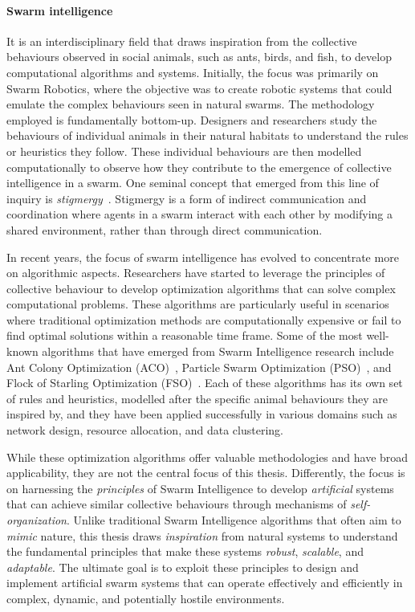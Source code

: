 \paragraph*{Swarm intelligence} It is an interdisciplinary field that draws inspiration from the collective behaviours observed in social animals, 
 such as ants, birds, and fish, to develop computational algorithms and systems. 
 Initially, the focus was primarily on Swarm Robotics, 
 where the objective was to create robotic systems that could emulate the complex behaviours seen in natural swarms. 
 The methodology employed is fundamentally bottom-up. 
 Designers and researchers study the behaviours of individual animals in their natural habitats to understand the rules or heuristics they follow. 
 These individual behaviours are then modelled computationally to observe how they contribute to the emergence of collective intelligence in a swarm. 
 One seminal concept that emerged from this line of inquiry is \textit{stigmergy}~\cite{DBLP:journals/fgcs/DorigoBT00}. 
 Stigmergy is a form of indirect communication and coordination where agents in a swarm interact with each other by modifying a shared environment, rather than through direct communication.

In recent years, the focus of swarm intelligence has evolved to concentrate more on algorithmic aspects. 
 Researchers have started to leverage the principles of collective behaviour to develop optimization algorithms that can solve complex computational problems. 
 These algorithms are particularly useful in scenarios where traditional optimization methods are computationally expensive or fail to find optimal solutions within a reasonable time frame. 
 Some of the most well-known algorithms that have emerged from Swarm Intelligence research include Ant Colony Optimization (ACO)~\cite{DBLP:journals/tsmc/DorigoMC96}, Particle Swarm Optimization (PSO)~\cite{DBLP:conf/icnn/KennedyE95}, and Flock of Starling Optimization (FSO)~\cite{DBLP:series/sci/FulgineiS11}. 
Each of these algorithms has its own set of rules and heuristics, modelled after the specific animal behaviours they are inspired by, and they have been applied successfully in various domains such as network design, resource allocation, and data clustering.

While these optimization algorithms offer valuable methodologies and have broad applicability, they are not the central focus of this thesis. 
 Differently, the focus is on harnessing the \emph{principles} of Swarm Intelligence to develop \emph{artificial} systems that can achieve similar collective behaviours through mechanisms of \emph{self-organization}. 
 Unlike traditional Swarm Intelligence algorithms that often aim to \textit{mimic} nature, this thesis draws \textit{inspiration} from natural systems to understand the fundamental principles that make these systems \emph{robust}, \emph{scalable}, and \emph{adaptable}. 
 The ultimate goal is to exploit these principles to design and implement artificial swarm systems that can operate effectively and efficiently in complex, dynamic, and potentially hostile environments. 
 
